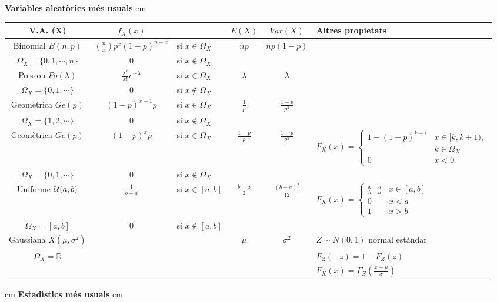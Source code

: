 \documentclass{article}
\def\R{\mathbb R}
\begin{document}
\textbf{Variables aleat\`ories m\'es usuals}
 cm

\begin{tabular}{|c|cl|c|c|l|}
V.A. (X) & $f_X(x)$ & & $E(X)$ & $Var(X)$ & Altres propietats \\
\hline
Binomial $B(n, p)$ & $\binom{n}{x} p^x (1-p)^{n-x}$ & si $x\in \Omega_X$ &
 $np$ & $np(1-p)$ & \\
$\Omega_X=\{ 0, 1, \cdots, n \}$ & $0$ & si $x \notin \Omega_X$ & & & \\ \hline
Poisson $Po(\lambda)$ & $\frac{\lambda^x}{x!} e^{-\lambda}$ & si $x\in \Omega_X$ & 
 $\lambda$ & $\lambda$ & \\
$\Omega_X=\{ 0, 1, \cdots \}$ & $0$ & si $x \notin \Omega_X$ & & & \\ \hline
Geom\`etrica $Ge(p)$ & $(1-p)^{x-1} p$ & si $x\in \Omega_X$
 & $\frac{1}{p}$ & $\frac{1-p}{p^2}$ & \\
$\Omega_X=\{ 1, 2, \cdots \}$ & $0$ & si $x \notin \Omega_X$ & & & \\ \hline
Geom\`etrica $Ge(p)$ & $(1-p)^x p$ & si $x\in \Omega_X$ & 
$\frac{1-p}{p}$ & $\frac{1-p}{p^2}$ &  
$F_X(x)=\begin{cases}
1-(1-p)^{k+1} & x \in [k, k+1), \\
 & k \in \Omega_X \\
0 & x < 0
\end{cases}$
\\
$\Omega_X=\{ 0, 1, \cdots \}$ & $0$ & si $x \notin \Omega_X$ & 
 & & 
\\ \hline
Uniforme ${\cal U}(a, b)$ & $\frac{1}{b-a}$ & si $x \in [a, b]$ & 
$\frac{b+a}{2}$ & $\frac{(b-a)^2}{12}$ & 
$F_X(x)=\begin{cases} 
\frac{x-a}{b-a} & x \in [a, b] \\
0 & x < a \\
1 & x > b
\end{cases}$ \\
$\Omega_X=[a, b]$ & 0 & si $x \notin [a, b]$ &  & & \\ \hline
Gaussiana $X(\mu, \sigma^2)$ & & & $\mu$ & $\sigma^2$ & $Z\sim N(0, 1)$ normal est\`andar \\
$\Omega_X=\R$ & & & &  & $F_Z(-z)=1-F_Z(z)$ \\
 & & & &  & $F_X(x)=F_Z(\frac{x-\mu}{\sigma})$ \\ \hline
\end{tabular}


 cm
\textbf{Estad\'\i stics m\'es usuals}
 cm
\end{document}
